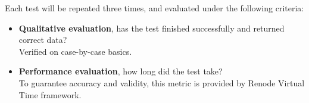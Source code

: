\noindent
Each test will be repeated three times, and evaluated under the following criteria:
\begin{itemize}
    \item{\textbf{Qualitative evaluation}, has the test finished successfully and returned correct data?\\
    Verified on case-by-case basics.}
    \item{\textbf{Performance evaluation}, how long did the test take?\\To guarantee accuracy and validity, this metric is
     provided by Renode Virtual Time framework.}
\end{itemize}

